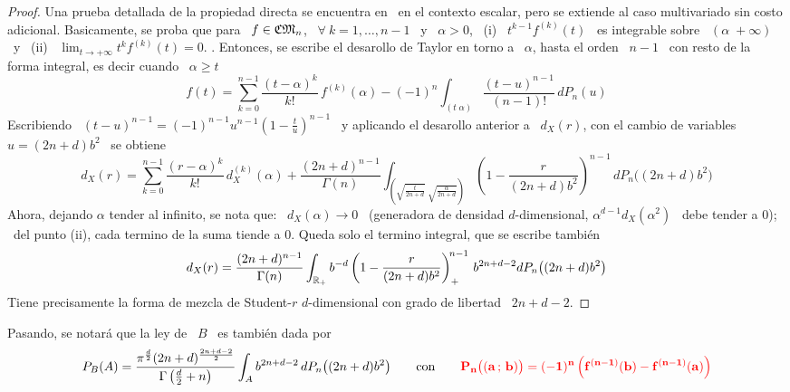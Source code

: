 \begin{proof}
  Una prueba detallada  de la propiedad directa se  encuentra en~\cite{Wil56} en
  el  contexto  escalar,  pero  se  extiende  al  caso  multivariado  sin  costo
  adicional.  Basicamente, se proba que para \  $f \in \mathfrak{CM}_n$, \ $\forall \: k =
  1,  \ldots ,  n-1$ \  y \  $\alpha >  0$, \  (i) \  $t^{k-1} f^{(k)}(t)$  \ es
  integrable sobre \  $(\alpha \; +\infty)$ \ y \  (ii) \ $\displaystyle \lim_{t
    \to +\infty} t^k f^{(k)}(t) = 0$. .   Entonces, se  escribe el  desarollo de Taylor  en torno  a \
  $\alpha$, hasta el  orden \ $n-1$ \  con resto de la forma  integral, es decir
  cuando \ $\alpha \ge t$
  \[
  f(t) =  \sum_{k=0}^{n-1} \frac{(t-\alpha)^k}{k!}  \,  f^{(k)}(\alpha) - (-1)^n
  \int_{(t \; \alpha)} \frac{(t-u)^{n-1}}{(n-1)!}  \, dP_n(u)
  \]
  Escribiendo  \  $(t-u)^{n-1}  =  (-1)^{n-1}  u^{n-1} \left(  1  -  \frac{t}{u}
  \right)^{n-1}$ \ y aplicando el desarollo anterior a \ $d_X(r)$, con el cambio
  de variables $u = (2 n + d) b^2$ \ se obtiene
  \[
  d_X(r)  =  \sum_{k=0}^{n-1}  \frac{(r-\alpha)^k}{k!}  \,  d_X^{(k)}(\alpha)  +
  \frac{(2  n + d)^{n-1}}{\Gamma(n)}  \int_{\left( \sqrt{\frac{t}{2  n +  d}} \;
      \sqrt{\frac{\alpha}{2 n + d}} \right)} \left(  1 - \frac{r}{(2 n + d) b^2}
  \right)^{n-1} \, dP_n\big( (2 n + d) b^2 \big)
  \]
  Ahora, dejando $\alpha$ tender al infinito, se nota que: \ $d_X(\alpha) \to 0$
  \ (generadora de densidad $d$-dimensional, $\alpha^{d-1} d_X(\alpha^2)$ \ debe
  tender a 0); \ del punto (ii), cada  termino de la suma tiende a 0. Queda solo
  el termino integral, que se escribe tambi\'en
  \[
  d_X(r) =  \frac{(2 n +  d)^{n-1}}{\Gamma(n)} \int_{\mathbb{R}_+} b^{-d} \left(  1 -
    \frac{r}{(2 n + d) b^2} \right)_+^{\!n-1} \, b^{2 n +d - 2} dP_n\big( (2 n +
  d) b^2 \big)
  \]
  Tiene precisamente la forma de mezcla de Student-$r$ $d$-dimensional con grado
  de libertad \ $2 n + d - 2$.
%
\end{proof}

Pasando, se notar\'a que la ley de \ $B$ \ es tambi\'en dada por
%
\[
P_B(A) = \frac{\pi^{\frac{d}{2}} (2 n + d)^{\frac{2 n + d - 2}{2}}}{\Gamma\left(
    \frac{d}{2} + n \right)}  \int_A b^{2 n + d - 2} \, dP_n\big(  (2 n + d) b^2
\big)  \qquad \mbox{con}  \qquad {\color{red}\bf P_n\big(  (a \, ; \,  b) \big)  =  (-1)^n \left(
    f^{(n-1)}(b) - f^{(n-1)}(a) \right)}
\]


